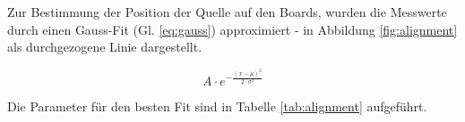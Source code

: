 \documentclass[usenames,dvipsnames]{include/protokollclass}
\begin{document}
	Zur Bestimmung der Position der Quelle auf den Boards, wurden die Messwerte durch einen Gauss-Fit (Gl. \ref{eq:gauss}) approximiert - in Abbildung \ref{fig:alignment} als durchgezogene Linie dargestellt.
	
\begin{equation}
 	A\cdot e^{-\frac{(x-\mu)^{2}}{2\cdot \sigma^{2}}}
 	\label{eq:gauss}
\end{equation}
	
	Die Parameter für den besten Fit sind in Tabelle \ref{tab:alignment} aufgeführt.
	
	
	
    
   

	\begingroup
	\let\clearpage\relax



    \endgroup
\end{document}
